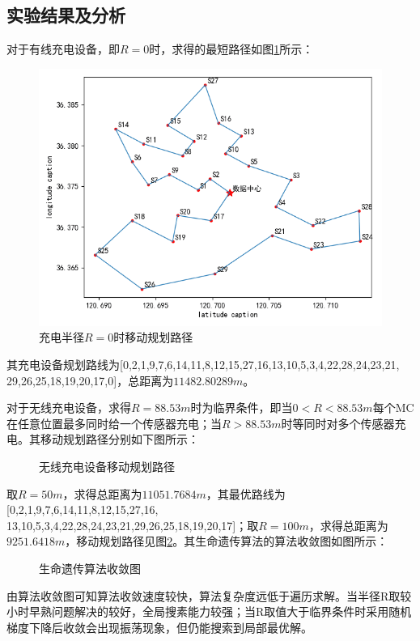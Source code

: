 \documentclass{whutmod}
\begin{document}
    \subsection{实验结果及分析}
        对于有线充电设备，即$R=0$时，求得的最短路径如图\ref{sssssssssss}所示：
        \begin{figure}[H]
        	\centering
        	\includegraphics[width=.6\textwidth]{figures/w1.png}
        	\caption{充电半径$R=0$时移动规划路径}\label{sssssssssss}
        \end{figure}
       其充电设备规划路线为[0,2,1,9,7,6,14,11,8,12,15,27,16,13,10,5,3,4,22,28,24,23,21,\\29,26,25,18,19,20,17,0]，总距离为$11482.80289m$。
        
        对于无线充电设备，求得$R=88.53m$时为临界条件，即当$0<R<88.53m$每个MC在任意位置最多同时给一个传感器充电；当$R>88.53m$时等同时对多个传感器充电。其移动规划路径分别如下图所示：
        \begin{figure}[H]
        	\centering
        	\caption{无线充电设备移动规划路径}
        	\label{ssw}
        \end{figure}
    
    取$R=50m$，求得总距离为$11051.7684m$，其最优路线为 [0,2,1,9,7,6,14,11,8,12,15,27,16,\\13,10,5,3,4,22,28,24,23,21,29,26,25,18,19,20,17]；取$R=100m$，求得总距离为$9251.6418m$，移动规划路径见图\ref{ssw}。其生命遗传算法的算法收敛图如图所示：
        \begin{figure}[H]
	\centering
	\caption{生命遗传算法收敛图}
		\end{figure}
	    由算法收敛图可知算法收敛速度较快，算法复杂度远低于遍历求解。当半径R取较小时早熟问题解决的较好，全局搜素能力较强；当R取值大于临界条件时采用随机梯度下降后收敛会出现振荡现象，但仍能搜索到局部最优解。
	
\end{document}

